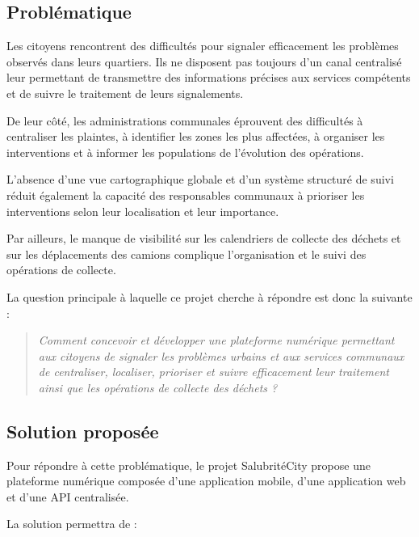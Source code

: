 \documentclass[11pt,a4paper,oneside]{report}
\begin{document}
	\subsection{Problématique}
	
	Les citoyens rencontrent des difficultés pour signaler
	efficacement les problèmes observés dans leurs
	quartiers. Ils ne disposent pas toujours d'un canal
	centralisé leur permettant de transmettre des
	informations précises aux services compétents et de
	suivre le traitement de leurs signalements.
	
	De leur côté, les administrations communales
	éprouvent des difficultés à centraliser les plaintes,
	à identifier les zones les plus affectées, à organiser
	les interventions et à informer les populations de
	l'évolution des opérations.
	
	L'absence d'une vue cartographique globale et d'un
	système structuré de suivi réduit également la capacité
	des responsables communaux à prioriser les
	interventions selon leur localisation et leur importance.
	
	Par ailleurs, le manque de visibilité sur les calendriers
	de collecte des déchets et sur les déplacements des
	camions complique l'organisation et le suivi des
	opérations de collecte.
	
	La question principale à laquelle ce projet cherche à
	répondre est donc la suivante :
	
	\begin{quote}
		\textit{Comment concevoir et développer une plateforme
			numérique permettant aux citoyens de signaler les
			problèmes urbains et aux services communaux de
			centraliser, localiser, prioriser et suivre efficacement
			leur traitement ainsi que les opérations de collecte
			des déchets ?}
	\end{quote}
	
	\subsection{Solution proposée}
	
	Pour répondre à cette problématique, le projet
	SalubritéCity propose une plateforme numérique
	composée d'une application mobile, d'une application
	web et d'une API centralisée.
	
	La solution permettra de :
	
\end{document}
